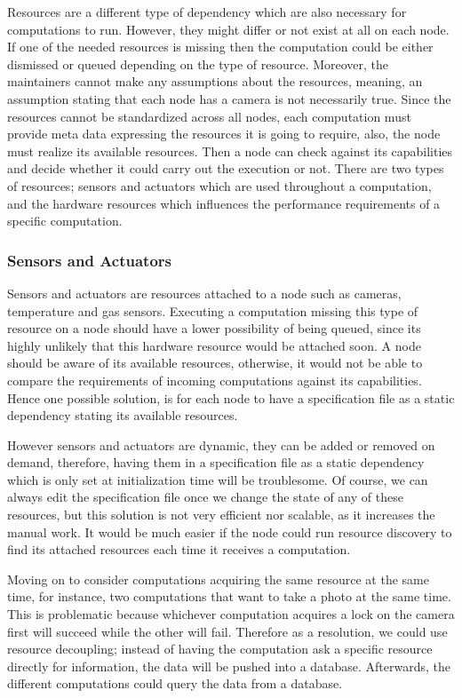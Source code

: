 Resources are a different type of dependency which are also necessary for computations to run. However, they might differ or not exist at all on each node. If one of the needed resources is missing then the computation could be either dismissed or queued depending on the type of resource. Moreover, the maintainers cannot make any assumptions about the resources, meaning, an assumption stating that each node has a camera is not necessarily true. Since the resources cannot be standardized across all nodes, each computation must provide meta data expressing the resources it is going to require, also, the node must realize its available resources. Then a node can check against its capabilities and decide whether it could carry out the execution or not. There are two types of resources; sensors and actuators which are used throughout a computation, and the hardware resources which influences the performance requirements of a specific computation.


\subsubsection{Sensors and Actuators}

  Sensors and actuators are resources attached to a node such as cameras, temperature and gas sensors. Executing a computation missing this type of resource on a node should have a lower possibility of being queued, since its highly unlikely that this hardware resource would be attached soon. A node should be aware of its available resources, otherwise, it would not be able to compare the requirements of incoming computations against its capabilities. Hence one possible solution, is for each node to have a specification file as a static dependency stating its available resources.
  
  However sensors and actuators are dynamic, they can be added or removed on demand, therefore, having them in a specification file as a static dependency which is only set at initialization time will be troublesome. Of course, we can always edit the specification file once we change the state of any of these resources, but this solution is not very efficient nor scalable, as it increases the manual work. It would be much easier if the node could run resource discovery to find its attached resources each time it receives a computation.
  
  Moving on to consider computations acquiring the same resource at the same time, for instance, two computations that want to take a photo at the same time. This is problematic because whichever computation acquires a lock on the camera first will succeed while the other will fail. Therefore as a resolution, we could use resource decoupling; instead of having the computation ask a specific resource directly for information, the  data will be pushed into a database. Afterwards, the different computations could query the data from a database.
  
